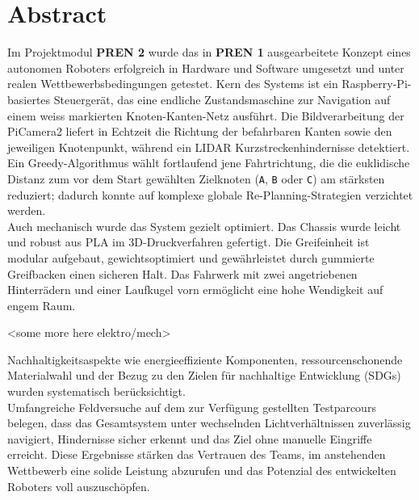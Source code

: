\documentclass[main.tex]{subfiles} %
\begin{document}
\section*{Abstract}

Im Projektmodul \textbf{PREN 2} wurde das in \textbf{PREN 1} ausgearbeitete
Konzept eines autonomen Roboters erfolgreich in Hardware und Software
umgesetzt und unter realen Wettbewerbsbedingungen getestet.
Kern des Systems ist ein Raspberry-Pi-basiertes Steuergerät, das eine
endliche Zustandsmaschine zur Navigation auf einem weiss markierten
Knoten-Kanten-Netz ausführt. Die Bildverarbeitung der PiCamera2
liefert in Echtzeit die Richtung der befahrbaren Kanten sowie den
jeweiligen Knotenpunkt, während ein LIDAR Kurzstreckenhindernisse
detektiert. Ein Greedy-Algorithmus wählt fortlaufend jene Fahrtrichtung,
die die euklidische Distanz zum vor dem Start gewählten Zielknoten
(\texttt{A}, \texttt{B} oder \texttt{C}) am stärksten reduziert; dadurch
konnte auf komplexe globale Re-Planning-Strategien verzichtet werden.\\

Auch mechanisch wurde das System gezielt optimiert. Das Chassis wurde leicht 
und robust aus PLA im 3D-Druckverfahren gefertigt. Die Greifeinheit ist modular 
aufgebaut, gewichtsoptimiert und gewährleistet durch gummierte Greifbacken einen 
sicheren Halt. Das Fahrwerk mit zwei angetriebenen Hinterrädern und einer Laufkugel 
vorn ermöglicht eine hohe Wendigkeit auf engem Raum.

<some more here elektro/mech>

Nachhaltigkeitsaspekte wie energieeffiziente Komponenten, ressourcenschonende
Materialwahl und der Bezug zu den Zielen für nachhaltige Entwicklung (SDGs) wurden
systematisch berücksichtigt.\\

Umfangreiche Feldversuche auf dem zur Verfügung gestellten Testparcours belegen,
dass das Gesamtsystem unter wechselnden Lichtverhältnissen zuverlässig
navigiert, Hindernisse sicher erkennt und das Ziel ohne manuelle Eingriffe
erreicht. Diese Ergebnisse stärken das Vertrauen des Teams, im anstehenden
Wettbewerb eine solide Leistung abzurufen und das Potenzial des entwickelten
Roboters voll auszuschöpfen.
\end{document}
